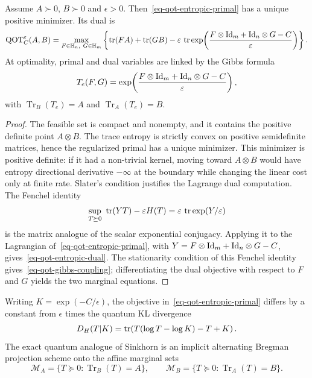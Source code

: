 \begin{prop}\label{prop-qot-entropic-duality}
	Assume $A\succ0$, $B\succ0$ and $\epsilon>0$. Then~\eqref{eq-qot-entropic-primal} has a unique positive minimizer. Its dual is
	\begin{equation}\label{eq-qot-entropic-dual}
		\mathrm{QOT}_C^\varepsilon(A,B)
		=
		\max_{F\in\mathbb H_n,\ G\in\mathbb H_m}
		\left\{
			\operatorname{tr}(FA)+\operatorname{tr}(GB)
			-\varepsilon\,
			\operatorname{tr}\exp\!\left(\frac{F\otimes\mathrm{Id}_m+\mathrm{Id}_n\otimes G-C}{\varepsilon}\right)
		\right\}.
	\end{equation}
	At optimality, primal and dual variables are linked by the Gibbs formula
	\begin{equation}\label{eq-qot-gibbs-coupling}
		T_e(F,G)
		=
		\exp\!\left(\frac{F\otimes\mathrm{Id}_m+\mathrm{Id}_n\otimes G-C}{\varepsilon}\right),
	\end{equation}
	with $\operatorname{Tr}_B(T_e)=A$ and $\operatorname{Tr}_A(T_e)=B$.
\end{prop}

\begin{proof}
	The feasible set is compact and nonempty, and it contains the positive definite point $A\otimes B$. The trace entropy is strictly convex on positive semidefinite matrices, hence the regularized primal has a unique minimizer. This minimizer is positive definite: if it had a non-trivial kernel, moving toward $A\otimes B$ would have entropy directional derivative $-\infty$ at the boundary while changing the linear cost only at finite rate. Slater's condition justifies the Lagrange dual computation. The Fenchel identity
	\[
		\sup_{T\succeq0}\ \operatorname{tr}(YT)-\varepsilon H(T)
		=
		\varepsilon\,\operatorname{tr}\exp(Y/\varepsilon)
	\]
	is the matrix analogue of the scalar exponential conjugacy. Applying it to the Lagrangian of~\eqref{eq-qot-entropic-primal}, with
	$Y=F\otimes\mathrm{Id}_m+\mathrm{Id}_n\otimes G-C$, gives~\eqref{eq-qot-entropic-dual}. The stationarity condition of this Fenchel identity gives~\eqref{eq-qot-gibbs-coupling}; differentiating the dual objective with respect to $F$ and $G$ yields the two marginal equations.
\end{proof}

Writing $K=\exp(-C/\epsilon)$, the objective in~\eqref{eq-qot-entropic-primal} differs by a constant from $\epsilon$ times the quantum KL divergence
\[
	D_H(T|K)
	=
	\operatorname{tr}\!\left(T(\log T-\log K)-T+K\right).
\]
The exact quantum analogue of Sinkhorn is an implicit alternating Bregman projection scheme onto the affine marginal sets
\[
	\mathcal M_A=\{T\succeq0:\operatorname{Tr}_B(T)=A\},
	\qquad
	\mathcal M_B=\{T\succeq0:\operatorname{Tr}_A(T)=B\}.
\]

